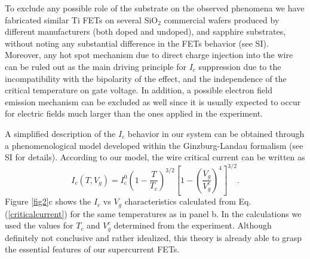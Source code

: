 \documentclass[prl,twocolumn,reprint,graphicx,showpacs,superscriptaddress,floatfix]{revtex4-1}
\begin{document}
To exclude any possible role of the substrate on the observed phenomena we have fabricated similar Ti FETs on several SiO$_2$ commercial wafers produced by different manufacturers (both doped and undoped), and sapphire substrates, without noting any substantial difference in the FETs behavior (see SI). 
Moreover, any hot spot mechanism due to direct charge injection into the wire can be ruled out as the main driving principle for $I_c$ suppression due to the incompatibility with the bipolarity of the effect, and the  independence of the critical temperature on gate voltage. In addition, a possible electron field emission mechanism can be excluded as well since it is usually expected to occur for electric fields much larger than the ones applied in the experiment.

A simplified  description of the $I_c$ behavior in our system can be obtained through a phenomenological model developed within the Ginzburg-Landau formalism \cite{Landau1950} (see SI for details). According to our model, the wire critical current can be written as 
\begin{equation}
I_c(T,V_g)=I_c^0 \left( 1-\frac{T}{T_c}\right )^{3/2}\left [1- \left (\frac{V_g}{V_g^c} \right )^4\right]^{3/2}.
\label{criticalcurrent}
\end{equation}
Figure \ref{fig2}c shows the  $I_c$ vs $V_g$ characteristics calculated from Eq. (\ref{criticalcurrent})  for the same temperatures as in panel b. 
In the calculations we used the values for $T_c$ and $V_g^c$ determined from the experiment.
Although definitely not conclusive and rather idealized, this theory is already able to grasp the essential features of our supercurrent FETs.
\end{document}
